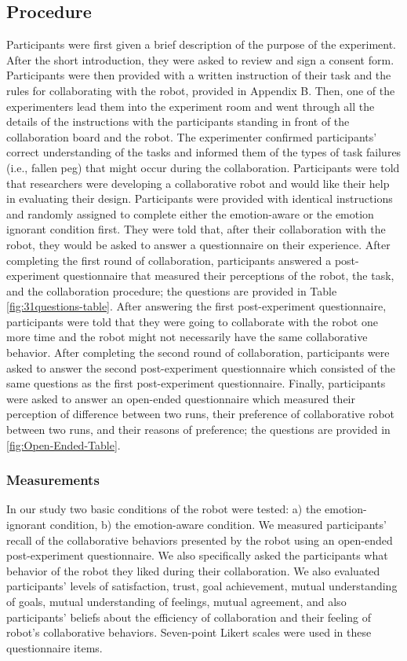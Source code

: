 \documentclass[12pt]{report}
\begin{document}
\subsection{Procedure}
\label{sec:procedure}
Participants were first given a brief description of the purpose of the
experiment. After the short introduction, they were asked to review and sign a
consent form. Participants were then provided with a written instruction of
their task and the rules for collaborating with the robot, provided in Appendix
B. Then, one of the experimenters lead them into the experiment room and 
went through all the details of the instructions with the participants
standing in front of the collaboration board and the robot. The experimenter
confirmed participants' correct understanding of the tasks and informed them
of the types of task failures (i.e., fallen peg) that might occur during the
collaboration. Participants were told that researchers were developing a
collaborative robot and would like their help in evaluating their design.
Participants were provided with identical instructions and randomly assigned to
complete either the emotion-aware or the emotion ignorant condition first. They
were told that, after their collaboration with the robot, they would be asked to
answer a questionnaire on their experience. After completing the first round of
collaboration, participants answered a post-experiment questionnaire that
measured their perceptions of the robot, the task, and the collaboration
procedure; the questions are provided in Table \ref{fig:31questions-table}.
After answering the first post-experiment questionnaire, participants were told that they were going to collaborate with the robot one more time and
the robot might not necessarily have the same collaborative behavior. After
completing the second round of collaboration, participants were asked to answer
the second post-experiment questionnaire which consisted of the same questions
as the first post-experiment questionnaire. Finally, participants were asked
to answer an open-ended questionnaire which measured their perception of
difference between two runs, their preference of collaborative robot between two
runs, and their reasons of preference; the questions are provided in
\ref{fig:Open-Ended-Table}.

\subsubsection{Measurements}
\label{sec:Measurements}
In our study two basic conditions of the robot were tested: a) the
emotion-ignorant condition, b) the emotion-aware condition. We measured
participants' recall of the collaborative behaviors presented by the robot using
an open-ended post-experiment questionnaire. We also specifically asked the
participants what behavior of the robot they liked during their collaboration.
We also evaluated participants' levels of satisfaction, trust, goal achievement,
mutual understanding of goals, mutual understanding of feelings, mutual
agreement, and also participants' beliefs about the efficiency of collaboration
and their feeling of robot's collaborative behaviors. Seven-point Likert scales
were used in these questionnaire items.
\end{document}
